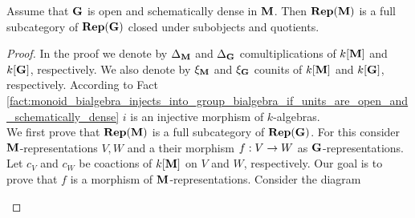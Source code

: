 \begin{theorem}\label{theorem:full_subcategory_closed_under_subobjects_and_quotients}
Assume that $\mathbf{G}$ is open and schematically dense in $\mathbf{M}$. Then $\mathbf{Rep}(\mathbf{M})$ is a full subcategory of $\mathbf{Rep}(\mathbf{G})$ closed under subobjects and quotients.
\end{theorem}
\begin{proof}
In the proof we denote by $\Delta_{\mathbf{M}}$ and $\Delta_{\mathbf{G}}$ comultiplications of $k[\mathbf{M}]$ and $k[\mathbf{G}]$, respectively. We also denote by $\xi_{\mathbf{M}}$ and $\xi_{\mathbf{G}}$ counits of $k[\mathbf{M}]$ and $k[\mathbf{G}]$, respectively. According to Fact \ref{fact:monoid_bialgebra_injects_into_group_bialgebra_if_units_are_open_and_schematically_dense} $i$ is an injective morphism of $k$-algebras.\\
We first prove that $\mathbf{Rep}(\mathbf{M})$ is a full subcategory of $\mathbf{Rep}(\mathbf{G})$. For this consider $\mathbf{M}$-representations $V,W$ and a their morphism $f:V\rightarrow W$ as $\mathbf{G}$-representations. Let $c_V$ and $c_W$ be coactions of $k[\mathbf{M}]$ on $V$ and $W$, respectively. Our goal is to prove that $f$ is a morphism of $\mathbf{M}$-representations. Consider the diagram
\begin{center}
\end{center}
\end{proof}
